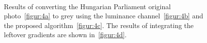 \documentclass[conference]{IEEEtran}
\begin{document}
\begin{figure}[t]  
  \centering
  \\
\caption{Results of converting the Hungarian Parliament original photo~\ref{figur:4a} to grey using the luminance channel~\ref{figur:4b} and the proposed algorithm~\ref{figur:4c}. The results of integrating the leftover gradients are shown in~\ref{figur:4d}.}
\label{fig:4}
\end{figure}
\end{document}
